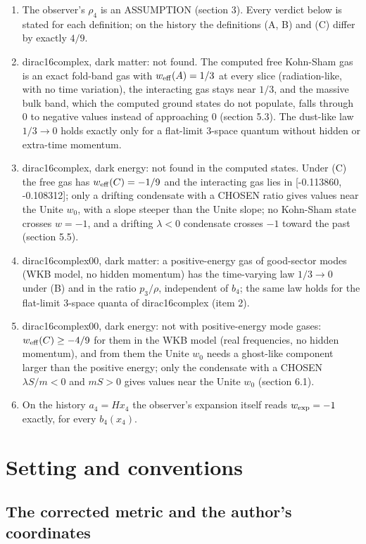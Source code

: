 \documentclass[11pt]{article}
\begin{document}
\begin{enumerate}
\item The observer's $\rho_4$ is an ASSUMPTION (section 3). Every verdict below is stated for each definition; on the history the definitions (A, B) and (C) differ by exactly $4/9$.
\item dirac16complex, dark matter: not found. The computed free Kohn-Sham gas is an exact fold-band gas with $w_{\rm eff}(A) = 1/3$ at every slice (radiation-like, with no time variation), the interacting gas stays near $1/3$, and the massive bulk band, which the computed ground states do not populate, falls through 0 to negative values instead of approaching 0 (section 5.3). The dust-like law $1/3 \to 0$ holds exactly only for a flat-limit 3-space quantum without hidden or extra-time momentum.
\item dirac16complex, dark energy: not found in the computed states. Under (C) the free gas has $w_{\rm eff}(C) = -1/9$ and the interacting gas lies in [-0.113860, -0.108312]; only a drifting condensate with a CHOSEN ratio gives values near the Unite $w_0$, with a slope steeper than the Unite slope; no Kohn-Sham state crosses $w = -1$, and a drifting $\lambda < 0$ condensate crosses $-1$ toward the past (section 5.5).
\item dirac16complex00, dark matter: a positive-energy gas of good-sector modes (WKB model, no hidden momentum) has the time-varying law $1/3 \to 0$ under (B) and in the ratio $p_3/\rho$, independent of $b_4$; the same law holds for the flat-limit 3-space quanta of dirac16complex (item 2).
\item dirac16complex00, dark energy: not with positive-energy mode gases: $w_{\rm eff}(C) \geq -4/9$ for them in the WKB model (real frequencies, no hidden momentum), and from them the Unite $w_0$ needs a ghost-like component larger than the positive energy; only the condensate with a CHOSEN $\lambda S/m < 0$ and $mS > 0$ gives values near the Unite $w_0$ (section 6.1).
\item On the history $a_4 = Hx_4$ the observer's expansion itself reads $w_{\rm exp} = -1$ exactly, for every $b_4(x_4)$.
\end{enumerate}

\section{Setting and conventions}

\subsection{The corrected metric and the author's coordinates}
\end{document}
